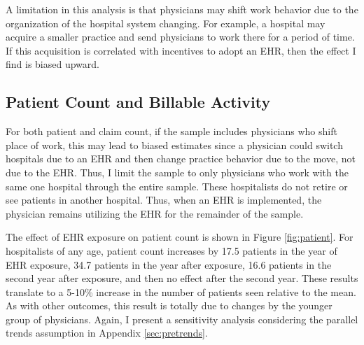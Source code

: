 \documentclass[12pt]{article}
\begin{document}
A limitation in this analysis is that physicians may shift work behavior due to the organization of the hospital system changing. For example, a hospital may acquire a smaller practice and send physicians to work there for a period of time. If this acquisition is correlated with incentives to adopt an EHR, then the effect I find is biased upward.




\subsection{Patient Count and Billable Activity}\label{sec:patientcount}

For both patient and claim count, if the sample includes physicians who shift place of work, this may lead to biased estimates since a physician could switch hospitals due to an EHR and then change practice behavior due to the move, not due to the EHR. Thus, I limit the sample to only physicians who work with the same one hospital through the entire sample. These hospitalists do not retire or see patients in another hospital. Thus, when an EHR is implemented, the physician remains utilizing the EHR for the remainder of the sample. 

The effect of EHR exposure on patient count is shown in Figure \ref{fig:patient}. For hospitalists of any age, patient count increases by 17.5 patients in the year of EHR exposure, 34.7 patients in the year after exposure, 16.6 patients in the second year after exposure, and then no effect after the second year. These results translate to a 5-10\% increase in the number of patients seen relative to the mean. As with other outcomes, this result is totally due to changes by the younger group of physicians. Again, I present a sensitivity analysis considering the parallel trends assumption in Appendix \ref{sec:pretrends}. 
\end{document}
